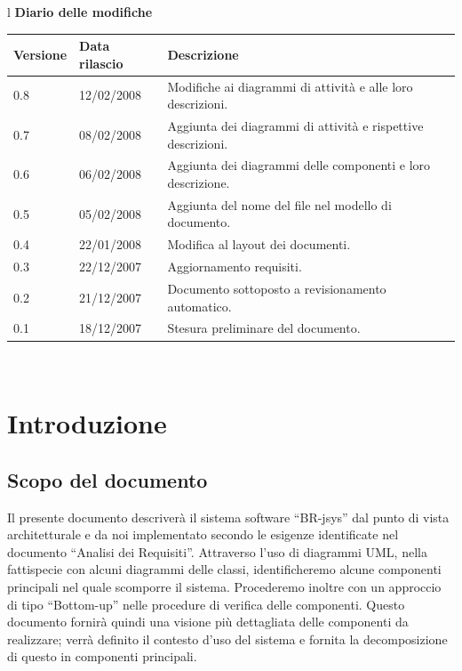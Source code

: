 \documentclass[11pt,titlepage,a4paper]{report}
\begin{document}
\begin{center}
\begin{table}[hbtp]
\large{
\begin{tabular}{l}
\Large{\textbf{\textsf{Diario delle modifiche}}} \\
\begin{tabular}{||p{2cm}||p{3.5cm}||p{6cm}||} \hline
\textbf{Versione} & \textbf{Data rilascio} & \textbf{Descrizione} \\ \hline
0.8 & 12/02/2008 & Modifiche ai diagrammi di attivit\`a e alle loro descrizioni.\\ \hline
0.7 & 08/02/2008 & Aggiunta dei diagrammi di attivit\`a e rispettive descrizioni.\\ \hline
0.6 & 06/02/2008 & Aggiunta dei diagrammi delle componenti e loro descrizione.\\ \hline
0.5 & 05/02/2008 & Aggiunta del nome del file nel modello di documento.\\ \hline
0.4 & 22/01/2008 & Modifica al layout dei documenti.\\ \hline
0.3 & 22/12/2007 & Aggiornamento requisiti. \\ \hline \hline
0.2 & 21/12/2007 & Documento sottoposto a revisionamento automatico.\\ \hline
0.1 & 18/12/2007 & Stesura preliminare del documento. \\ \hline

\end{tabular} \\
\end{tabular}

}
\end{table}
\end{center}
\newpage
\tableofcontents
\chapter{Introduzione}
\section{Scopo del documento}
Il presente documento descriver\`a il sistema software ``BR-jsys'' dal punto di vista architetturale e da noi implementato secondo le esigenze identificate nel documento ``Analisi dei Requisiti''. Attraverso l'uso di diagrammi UML, nella fattispecie con alcuni diagrammi delle classi, identificheremo alcune componenti principali nel quale scomporre il sistema. Procederemo inoltre con un approccio di tipo ``Bottom-up'' nelle procedure di verifica delle componenti. Questo documento fornir\`a quindi una visione pi\`u dettagliata delle componenti da realizzare; verr\`a definito il contesto d'uso del sistema e fornita la decomposizione di questo in componenti principali.
\end{document}
